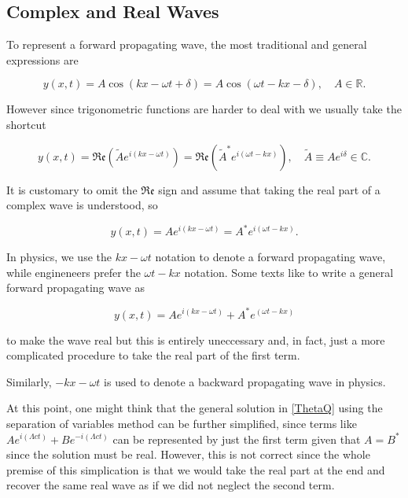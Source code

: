 \documentclass[a4paper,12pt]{report}
\begin{document}
\subsection{Complex and Real Waves} \label{explain}

To represent a forward propagating wave, the most traditional and general expressions are

\begin{equation}
	y(x,t) = A\cos (kx-\omega t+\delta ) = A \cos (\omega t - kx - \delta ), \quad A \in \mathbb{R}.
\end{equation}

However since trigonometric functions are harder to deal with we usually take the shortcut 

\begin{equation}
	y(x,t) = \mathfrak{Re} (\tilde{A} e^{i(kx-\omega t)} ) = \mathfrak{Re} (\tilde{A} ^*e^{i(\omega t-kx)} ), \quad  \tilde{A} \equiv  Ae^{i\delta }   \in \mathbb{C}.   
\end{equation}

It is customary to omit the \(\mathfrak{Re} \) sign and assume that taking the real part of a complex wave is understood, so

\begin{equation}
	y(x,t) = Ae^{i(kx-\omega t)} = A^*e^{i(\omega t-kx)}.  
\end{equation}

In physics, we use the \(kx-\omega t\) notation to denote a forward propagating wave, while engineneers prefer the \(\omega t-kx\) notation. Some texts like to write a general forward propagating wave as 

\begin{equation}
	y(x,t) = Ae^{i(kx-\omega t)} + A^*e^{(\omega t-kx)} 
\end{equation}

to make the wave real but this is entirely uneccessary and, in fact, just a more complicated procedure to take the real part of the first term.

Similarly, \(-kx-\omega t\) is used to denote a backward propagating wave in physics.

At this point, one might think that the general solution in \cref{ThetaQ} using the separation of variables method can be further simplified, since terms like \(Ae^{i(\Lambda ct)}+Be^{-i(\Lambda ct)}  \) can be represented by just the first term given that \(A = B^*\) since the solution must be real. However, this is not correct since the whole premise of this simplication is that we would take the real part at the end and recover the same real wave as if we did not neglect the second term.
\end{document}

